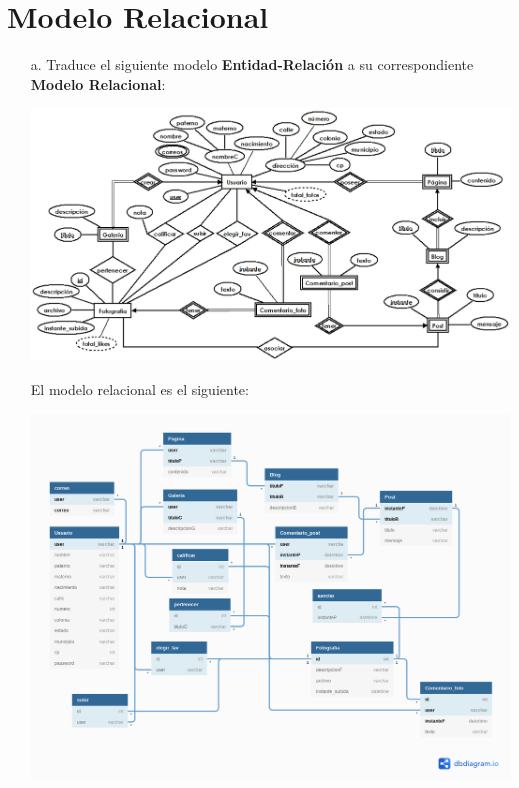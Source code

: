 \documentclass[12pt, letterpaper]{article}
\begin{document}
\begin{itemize}
\begin{itemize}
                      \end{itemize}

        \end{itemize}

    \section{Modelo Relacional}

        \begin{itemize}

            \item[a.] Traduce el siguiente modelo \textbf{Entidad-Relación} a su
                      correspondiente \textbf{Modelo Relacional}:\vspace{.3cm}
                      
                      \includegraphics[scale=0.3]{ER.png}\vspace{.3cm}

                      El modelo relacional es el siguiente:\vspace{.3cm}

                      \includegraphics[scale=0.3]{Facebook.png}


\end{itemize}
\end{document}
